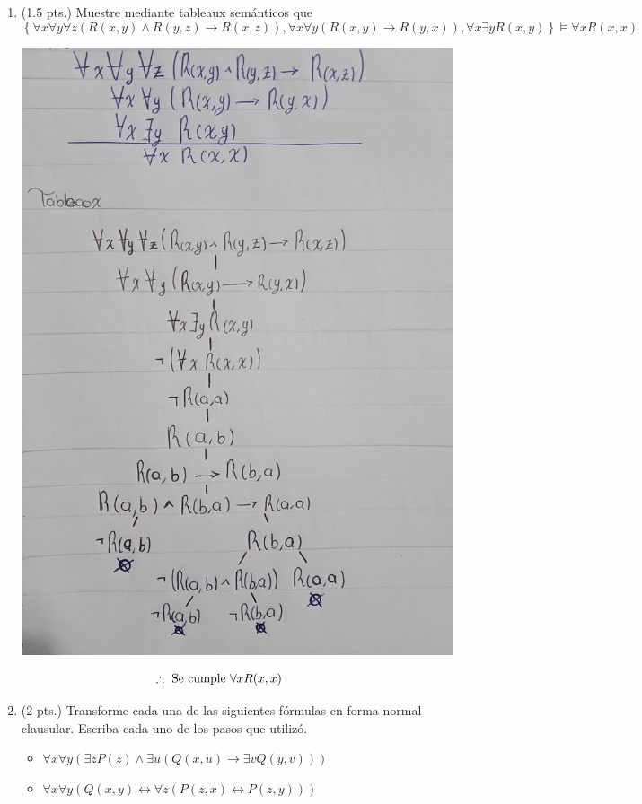 \documentclass[12pt,letterpaper]{article}
\begin{document}
\begin{enumerate}
\item (1.5 pts.) Muestre mediante tableaux semánticos que
  \[
  \left\{ 
  \forall x \forall y \forall z (R(x,y) \wedge R(y,z) \rightarrow R(x,z)),
  \forall x \forall y (R(x,y) \rightarrow R(y,x)),
  \forall x \exists y R(x,y) 
  \right\} 
  \vDash \forall x R(x,x)
  \]
  \begin{center}
    \hspace{-1.2cm} \includegraphics[width=\textwidth,height=0.8\textheight,keepaspectratio]{ejercicio1.png}
  \end{center}

  \[
  \hspace{-1cm}\therefore \text{ Se cumple } \forall \text{$x R(x,x)$}
  \]
  
  \newpage
  
\item (2 pts.) Transforme cada una de las siguientes fórmulas en forma normal clausular. Escriba cada uno de los pasos que utilizó.
  \begin{itemize}
  \item \( \forall x \forall y (\exists z P(z) \wedge \exists u (Q(x,u) \rightarrow \exists v Q(y,v))) \)
  \item \( \forall x \forall y \left( Q(x,y) \leftrightarrow \forall z (P(z,x) \leftrightarrow P(z,y)) \right) \)
  \end{itemize}
  

\end{enumerate}
\end{document}
